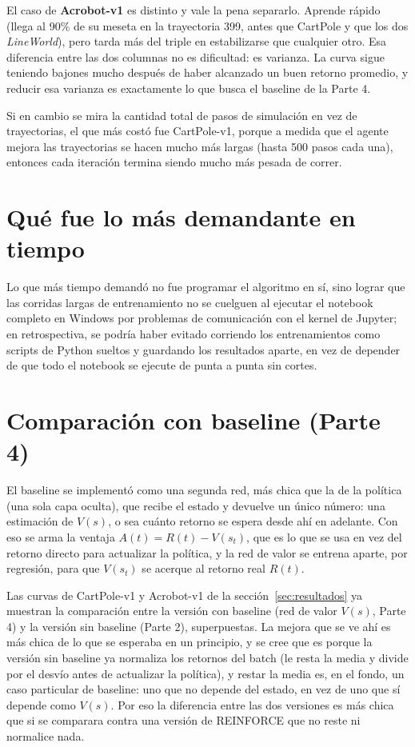 \documentclass[10pt, a4paper, twocolumn]{article}
\begin{document}
El caso de \textbf{Acrobot-v1} es distinto y vale la pena separarlo. Aprende rápido (llega al 90\% de su meseta en la trayectoria 399, antes que CartPole y que los dos \textit{LineWorld}), pero tarda más del triple en estabilizarse que cualquier otro. Esa diferencia entre las dos columnas no es dificultad: es varianza. La curva sigue teniendo bajones mucho después de haber alcanzado un buen retorno promedio, y reducir esa varianza es exactamente lo que busca el baseline de la Parte 4.

Si en cambio se mira la cantidad total de pasos de simulación en vez de trayectorias, el que más costó fue CartPole-v1, porque a medida que el agente mejora las trayectorias se hacen mucho más largas (hasta 500 pasos cada una), entonces cada iteración termina siendo mucho más pesada de correr.

\section{Qué fue lo más demandante en tiempo}

Lo que más tiempo demandó no fue programar el algoritmo en sí, sino lograr que las corridas largas de entrenamiento no se cuelguen al ejecutar el notebook completo en Windows por problemas de comunicación con el kernel de Jupyter; en retrospectiva, se podría haber evitado corriendo los entrenamientos como scripts de Python sueltos y guardando los resultados aparte, en vez de depender de que todo el notebook se ejecute de punta a punta sin cortes.

\section{Comparación con baseline (Parte 4)}

El baseline se implementó como una segunda red, más chica que la de la política (una sola capa oculta), que recibe el estado y devuelve un único número: una estimación de $V(s)$, o sea cuánto retorno se espera desde ahí en adelante. Con eso se arma la ventaja $A(t) = R(t) - V(s_t)$, que es lo que se usa en vez del retorno directo para actualizar la política, y la red de valor se entrena aparte, por regresión, para que $V(s_t)$ se acerque al retorno real $R(t)$.

Las curvas de CartPole-v1 y Acrobot-v1 de la sección~\ref{sec:resultados} ya muestran la comparación entre la versión con baseline (red de valor $V(s)$, Parte 4) y la versión sin baseline (Parte 2), superpuestas. La mejora que se ve ahí es más chica de lo que se esperaba en un principio, y se cree que es porque la versión sin baseline ya normaliza los retornos del batch (le resta la media y divide por el desvío antes de actualizar la política), y restar la media es, en el fondo, un caso particular de baseline: uno que no depende del estado, en vez de uno que sí depende como $V(s)$. Por eso la diferencia entre las dos versiones es más chica que si se comparara contra una versión de REINFORCE que no reste ni normalice nada.
\end{document}
